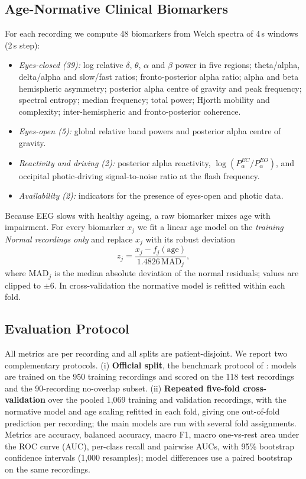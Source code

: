 \subsection{Age-Normative Clinical Biomarkers}
For each recording we compute 48 biomarkers from Welch spectra of 4\,s windows (2\,s step):
\begin{itemize}[leftmargin=*,itemsep=0pt,topsep=2pt]
\item \textit{Eyes-closed (39):} log relative $\delta$, $\theta$, $\alpha$ and $\beta$ power in five regions;
      theta/alpha, delta/alpha and slow/fast ratios; fronto-posterior alpha ratio; alpha and beta hemispheric
      asymmetry; posterior alpha centre of gravity and peak frequency; spectral entropy; median frequency;
      total power; Hjorth mobility and complexity; inter-hemispheric and fronto-posterior coherence.
\item \textit{Eyes-open (5):} global relative band powers and posterior alpha centre of gravity.
\item \textit{Reactivity and driving (2):} posterior alpha reactivity, $\log(P_\alpha^{EC}/P_\alpha^{EO})$, and
      occipital photic-driving signal-to-noise ratio at the flash frequency.
\item \textit{Availability (2):} indicators for the presence of eyes-open and photic data.
\end{itemize}
Because EEG slows with healthy ageing, a raw biomarker mixes age with impairment. For every biomarker $x_j$ we
fit a linear age model on the \emph{training Normal recordings only} and replace $x_j$ with its robust
deviation
\begin{equation}
z_j = \frac{x_j - f_j(\text{age})}{1.4826\,\mathrm{MAD}_j},
\end{equation}
where $\mathrm{MAD}_j$ is the median absolute deviation of the normal residuals; values are clipped to
$\pm6$. In cross-validation the normative model is refitted within each fold.

\subsection{Evaluation Protocol}
All metrics are per recording and all splits are patient-disjoint. We report two complementary protocols.
(i) \textbf{Official split}, the benchmark protocol of \citet{kim2023caueeg}: models are trained on the 950
training recordings and scored on the 118 test recordings and the 90-recording no-overlap subset.
(ii) \textbf{Repeated five-fold cross-validation} over the pooled 1,069 training and validation recordings,
with the normative model and age scaling refitted in each fold, giving one out-of-fold prediction per
recording; the main models are run with several fold assignments. Metrics are accuracy, balanced accuracy,
macro F1, macro one-vs-rest area under the ROC curve (AUC), per-class recall and pairwise AUCs, with 95\%
bootstrap confidence intervals (1,000 resamples); model differences use a paired bootstrap on the same
recordings.
